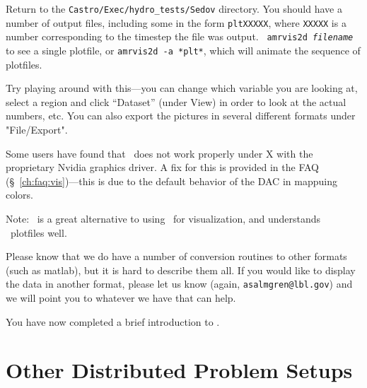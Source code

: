 \begin{enumerate}
  Return to the {\tt Castro/Exec/hydro\_tests/Sedov} directory.  You should
  have a number of output files, including some in the form {\tt *pltXXXXX},
  where {\tt XXXXX} is a number corresponding to the timestep the file
  was output.  {\tt
    amrvis2d {\em filename}} to see a single plotfile, or {\tt amrvis2d -a
  *plt*}, which will animate the sequence of plotfiles.

  Try playing
  around with this---you can change which variable you are
  looking at, select a region and click ``Dataset'' (under View)
  in order to look at the actual numbers, etc. You can also export the
  pictures in several different formats under "File/Export".

Some users have found that \amrvis\ does not work properly under X
with the proprietary Nvidia graphics driver.  A fix for this is
provided in the FAQ (\S~\ref{ch:faq:vis})---this is due to the default
behavior of the DAC in mappuing colors.  

Note: \yt\ is a great alternative to using \amrvis\ for visualization,
and understands \castro\ plotfiles well.

Please know that we do have a number of conversion routines to other
formats (such as matlab), but it is hard to describe them all. If you
would like to display the data in another format, please let us know
(again, {\tt asalmgren@lbl.gov}) and we will point you to whatever we have
that can help.

\end{enumerate}

You have now completed a brief introduction to \castro. 


\section{Other Distributed Problem Setups}

